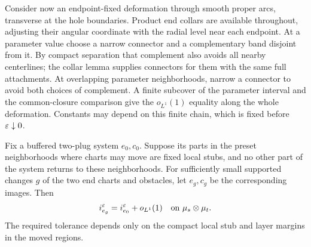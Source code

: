 Consider now an endpoint-fixed deformation through smooth proper arcs,
transverse at the hole boundaries.  Product end collars are available
throughout, adjusting their angular coordinate with the radial level
near each endpoint.  At a parameter value choose a narrow connector and
a complementary band disjoint from it.  By compact separation that
complement also avoids all nearby centerlines; the collar lemma supplies
connectors for them with the same full attachments.  At overlapping
parameter neighborhoods, narrow a connector to avoid both choices of
complement.  A finite subcover of the parameter interval and the
common-closure comparison give the $o_{L^1}(1)$ equality along the whole
deformation.  Constants may depend on this finite chain, which is fixed
before $\varepsilon\downarrow0$.

\begin{lemma}\label{lemma:chart-stability}
Fix a buffered two-plug system $e_0,c_0$.  Suppose its parts in the preset
neighborhoods where charts may move are fixed local stubs, and no other
part of the system returns to these neighborhoods.  For sufficiently
small supported changes $g$ of the two end charts and obstacles, let
$e_g,c_g$ be the corresponding images.  Then
\[
 i_{e_g}^\varepsilon=i_{e_0}^\varepsilon+o_{L^1}(1)
       \quad\text{on }\mu_s\otimes\mu_t.
\]
The required tolerance depends only on the compact local stub and layer
margins in the moved regions.
\end{lemma}

